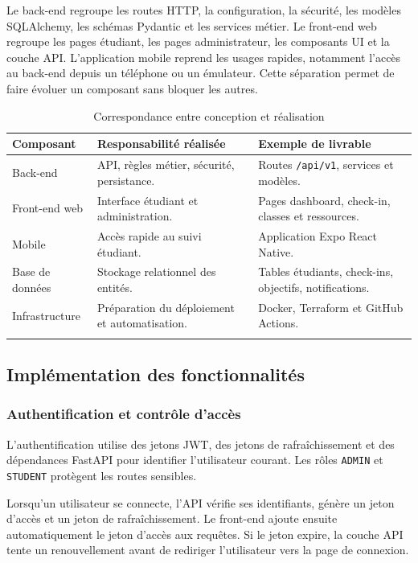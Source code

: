 \documentclass{rapportENSET}
\begin{document}
Le back-end regroupe les routes HTTP, la configuration, la sécurité, les modèles SQLAlchemy, les schémas Pydantic et les services métier. Le front-end web regroupe les pages étudiant, les pages administrateur, les composants UI et la couche API. L'application mobile reprend les usages rapides, notamment l'accès au back-end depuis un téléphone ou un émulateur. Cette séparation permet de faire évoluer un composant sans bloquer les autres.

\begin{longtable}{@{}L{0.24\textwidth}L{0.34\textwidth}L{0.32\textwidth}@{}}
\toprule
\textbf{Composant} & \textbf{Responsabilité réalisée} & \textbf{Exemple de livrable} \\
\midrule
\endhead
Back-end & API, règles métier, sécurité, persistance. & Routes \texttt{/api/v1}, services et modèles. \\
Front-end web & Interface étudiant et administration. & Pages dashboard, check-in, classes et ressources. \\
Mobile & Accès rapide au suivi étudiant. & Application Expo React Native. \\
Base de données & Stockage relationnel des entités. & Tables étudiants, check-ins, objectifs, notifications. \\
Infrastructure & Préparation du déploiement et automatisation. & Docker, Terraform et GitHub Actions. \\
\bottomrule
\caption{Correspondance entre conception et réalisation}
\end{longtable}

\subsection{Implémentation des fonctionnalités}
\subsubsection*{Authentification et contrôle d'accès}
L'authentification utilise des jetons JWT, des jetons de rafraîchissement et des dépendances FastAPI pour identifier l'utilisateur courant. Les rôles \texttt{ADMIN} et \texttt{STUDENT} protègent les routes sensibles.

Lorsqu'un utilisateur se connecte, l'API vérifie ses identifiants, génère un jeton d'accès et un jeton de rafraîchissement. Le front-end ajoute ensuite automatiquement le jeton d'accès aux requêtes. Si le jeton expire, la couche API tente un renouvellement avant de rediriger l'utilisateur vers la page de connexion.
\end{document}
